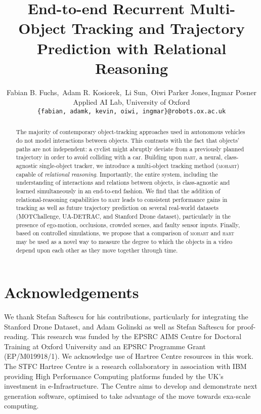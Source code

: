 \documentclass{article}
\title{End-to-end Recurrent Multi-Object Tracking and Trajectory Prediction with Relational Reasoning}
\author{
 Fabian B. Fuchs,\, Adam R. Kosiorek,\, Li Sun,\, Oiwi Parker Jones,\,Ingmar Posner\\
 Applied AI Lab,  University of Oxford \\
 \texttt{\{fabian, adamk, kevin, oiwi, ingmar\}@robots.ox.ac.uk} \\
}
\begin{document}
\maketitle


\begin{abstract}
The majority of contemporary object-tracking approaches used in autonomous vehicles do not model interactions between objects. This contrasts with the fact that objects' paths are not independent: a cyclist might abruptly deviate from a previously planned trajectory in order to avoid colliding with a car.
Building upon \textsc{hart}, a neural, class-agnostic single-object tracker, we introduce a multi-object tracking method (\textsc{mohart}) capable of \emph{relational reasoning}. Importantly, the entire system, including the understanding of interactions and relations between objects, is class-agnostic and learned simultaneously in an end-to-end fashion.
We find that the addition of relational-reasoning capabilities to \textsc{hart} leads to consistent performance gains in tracking as well as future trajectory prediction on several real-world datasets (MOTChallenge, UA-DETRAC, and Stanford Drone dataset), particularly in the presence of ego-motion, occlusions, crowded scenes, and faulty sensor inputs.
Finally, based on controlled simulations, we propose that a comparison of \textsc{mohart} and \textsc{hart} may be used as a novel way to measure the degree to which the objects in a video depend upon each other as they move together through time. 


\end{abstract}












\section*{Acknowledgements}
We thank Stefan Saftescu for his contributions, particularly for integrating the Stanford Drone Dataset, and Adam Golinski as well as Stefan Saftescu for proof-reading. This research was funded by the EPSRC AIMS Centre for Doctoral Training at Oxford University and an EPSRC Programme Grant (EP/M019918/1).
We acknowledge use of Hartree Centre resources in this work. The STFC Hartree Centre is a research collaboratory in association with IBM providing High Performance Computing platforms funded by the UK's investment in e-Infrastructure. The Centre aims to develop and demonstrate next generation software, optimised to take advantage of the move towards exa-scale computing.
\newpage  %

\newpage\clearpage
\end{document}
